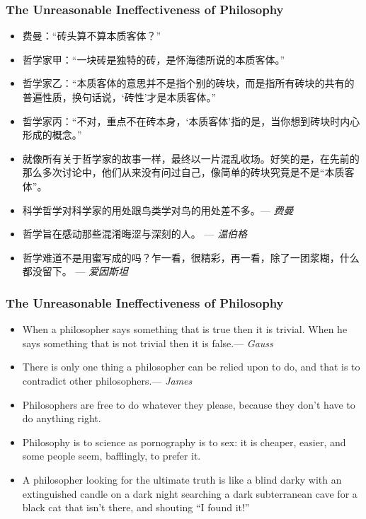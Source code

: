 \documentclass[UTF8,aspectratio=43,11pt,colorlinks,compress,openany]{beamer}%
\begin{document}
\begin{frame}\frametitle{The Unreasonable Ineffectiveness of Philosophy}
	\begin{block}{}\small
		\begin{itemize}
			\item 费曼：“砖头算不算本质客体？”
			\item 哲学家甲：“一块砖是独特的砖，是怀海德所说的本质客体。” 
			\item 哲学家乙：“本质客体的意思并不是指个别的砖块，而是指所有砖块的共有的普遍性质，换句话说，‘砖性’才是本质客体。”
			\item 哲学家丙：“不对，重点不在砖本身，‘本质客体’指的是，当你想到砖块时内心形成的概念。”
			\item 就像所有关于哲学家的故事一样，最终以一片混乱收场。好笑的是，在先前的那么多次讨论中，他们从来没有问过自己，像简单的砖块究竟是不是“本质客体”。
			\item 科学哲学对科学家的用处跟鸟类学对鸟的用处差不多。\hfill --- \textsl{费曼}
		\end{itemize}
	\end{block}
\begin{itemize}
	\item 哲学旨在感动那些混淆晦涩与深刻的人。 \hfill --- \textsl{温伯格}
	\item 哲学难道不是用蜜写成的吗？乍一看，很精彩，再一看，除了一团浆糊，什么都没留下。 \hfill --- \textsl{爱因斯坦}
\end{itemize}
\end{frame}

\begin{frame}\frametitle{The Unreasonable Ineffectiveness of Philosophy}
	\begin{itemize}
		\item When a philosopher says something that is true then it is trivial. When he says something that is not trivial then it is false.\hfill --- \textsl{Gauss}
		\item There is only one thing a philosopher can be relied upon to do, and that is to contradict other philosophers.\hfill --- \textsl{James}
		\item Philosophers are free to do whatever they please, because they don't have to do anything right.
		\item Philosophy is to science as pornography is to sex: it is cheaper, easier, and some people seem, bafflingly, to prefer it.
		\item A philosopher looking for the ultimate truth is like a blind darky with an extinguished candle on a dark night searching a dark subterranean cave for a black cat that isn't there, and shouting ``I found it!''
	\end{itemize}
\end{frame}
\end{document}
